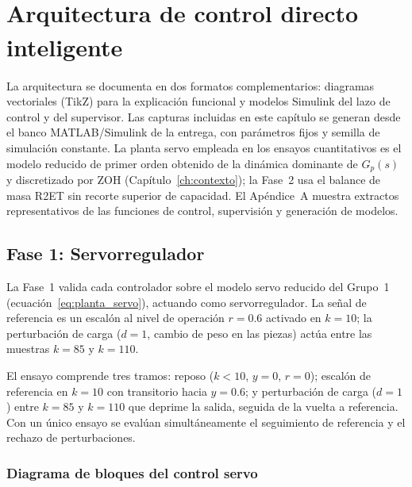 \chapter[Arquitectura de control directo inteligente]{Arquitectura de control directo inteligente\textsuperscript{\normalfont *}}
\label{ch:arquitectura}
\begingroup\renewcommand\thefootnote{*}\renewcommand{}\endgroup

La arquitectura se documenta en dos formatos complementarios: diagramas vectoriales (TikZ) para la explicación funcional y modelos Simulink del lazo de control y del supervisor. Las capturas incluidas en este capítulo se generan desde el banco MATLAB/Simulink de la entrega, con parámetros fijos y semilla de simulación constante. La planta servo empleada en los ensayos cuantitativos es el modelo reducido de primer orden obtenido de la dinámica dominante de $G_p(s)$ y discretizado por ZOH (Capítulo~\ref{ch:contexto}); la Fase~2 usa el balance de masa R2ET sin recorte superior de capacidad. El Apéndice~A muestra extractos representativos de las funciones de control, supervisión y generación de modelos.

\section{Fase 1: Servorregulador}

La Fase~1 valida cada controlador sobre el modelo servo reducido del Grupo~1 (ecuación~\ref{eq:planta_servo}), actuando como servorregulador. La señal de referencia es un escalón al nivel de operación $r=0.6$ activado en $k=10$; la perturbación de carga ($d=1$, cambio de peso en las piezas) actúa entre las muestras $k=85$ y $k=110$.

El ensayo comprende tres tramos: reposo ($k<10$, $y=0$, $r=0$); escalón de referencia en $k=10$ con transitorio hacia $y=0.6$; y perturbación de carga ($d=1$) entre $k=85$ y $k=110$ que deprime la salida, seguida de la vuelta a referencia. Con un único ensayo se evalúan simultáneamente el seguimiento de referencia y el rechazo de perturbaciones.

\subsection*{Diagrama de bloques del control servo}

